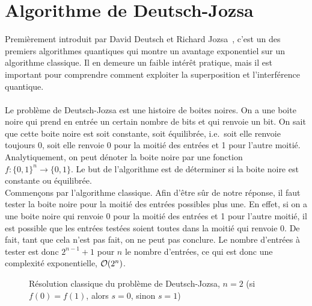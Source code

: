 \chapter{Algorithme de Deutsch-Jozsa}\label{ch:algorithme-de-deutsch-jozsa}

Premièrement introduit par David Deutsch et Richard Jozsa~\cite{deutsch-josza-ori}, c'est un des premiers
algorithmes quantiques qui montre un avantage exponentiel sur un algorithme classique.
Il en demeure un faible intérêt pratique, mais il est important pour comprendre
comment exploiter la superposition et l'interférence quantique.\\ \\
Le problème de Deutsch-Jozsa est une histoire de boites noires.
On a une boite noire qui prend en entrée un certain nombre de bits et qui renvoie
un bit.
On sait que cette boite noire est soit constante, soit équilibrée, i.e.\ soit elle
renvoie toujours 0, soit elle renvoie 0 pour la moitié des entrées et 1 pour l'autre
moitié.
Analytiquement, on peut dénoter la boite noire par une fonction $f:\{0,1\}^n \rightarrow \{0,1\}$.
Le but de l'algorithme est de déterminer si la boite noire est constante ou équilibrée.\\
Commençons par l'algorithme classique.
Afin d'être sûr de notre réponse, il faut tester la boite noire pour la moitié des
entrées possibles plus une.
En effet, si on a une boite noire qui renvoie 0 pour la moitié des entrées et 1 pour
l'autre moitié, il est possible que les entrées testées soient toutes dans la moitié
qui renvoie 0.
De fait, tant que cela n'est pas fait, on ne peut pas conclure.
Le nombre d'entrées à tester est donc $2^{n-1}+1$ pour $n$ le nombre d'entrées, ce qui
est donc une complexité exponentielle, $\order{2^n}$.
\begin{figure}[H]
    \centering
    \caption{Résolution classique du problème de Deutsch-Jozsa, $n=2$ (si $f(0) = f(1)$, alors $s = 0$, sinon $s = 1$)}
    \label{fig:clas-dj}
\end{figure}

